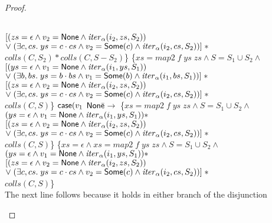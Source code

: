 \begin{proof}
\begin{itemize}
\begin{specification}
\\ \>\;     $[(zs = \epsilon \land v_2 = \mathsf{None} \land \mathit{iter}_\alpha(i_2, zs, S_2))$ 
\\ \>\;\;    $\vee\; (\exists c, cs.\; ys = c\cdot cs \land v_2 = \mathsf{Some}(c) \land 
                                \mathit{iter}_\alpha(i_2, cs, S_2))] \;*$ 
\\ \>\;     $\mathit{colls}(C,S_2) * \mathit{colls}(C, S - S_2)$\}
\nextline \{$xs = \mathit{map2}\;f\;ys\;zs \land 
                  S = S_1 \cup S_2 \land$ 
\\ \>\;     $[(ys = \epsilon \land v_1 = \mathsf{None} \land \mathit{iter}_\alpha(i_1, ys, S_1))$ 
\\ \>\;\;    $\vee\; (\exists b, bs.\; ys = b\cdot bs \land v_1 = \mathsf{Some}(b) \land 
                                \mathit{iter}_\alpha(i_1, bs, S_1))] \;*$ 
\\ \>\;     $[(zs = \epsilon \land v_2 = \mathsf{None} \land \mathit{iter}_\alpha(i_2, zs, S_2))$ 
\\ \>\;\;    $\vee\; (\exists c, cs.\; ys = c\cdot cs \land v_2 = \mathsf{Some}(c) \land 
                                \mathit{iter}_\alpha(i_2, cs, S_2))] \;*$ 
\\ \>\;     $\mathit{colls}(C,S)$\}
\nextline $\mathsf{case}(v_1$ 
\nextline \;\;\; $\mathsf{None}$\=$ \to $ 
\nextline \> \{$xs = \mathit{map2}\;f\;ys\;zs \land 
                  S = S_1 \cup S_2 \land$ 
\\ \> \>\;     $(ys = \epsilon \land v_1 = \mathsf{None} \land \mathit{iter}_\alpha(i_1, ys, S_1)) * $ 
\\ \> \>\;     $[(zs = \epsilon \land v_2 = \mathsf{None} \land \mathit{iter}_\alpha(i_2, zs, S_2))$ 
\\ \> \>\;\;    $\vee\; (\exists c, cs.\; ys = c\cdot cs \land v_2 = \mathsf{Some}(c) \land 
                                \mathit{iter}_\alpha(i_2, cs, S_2))] \;*$ 
\\ \> \>\;     $\mathit{colls}(C,S)$\}
\nextline \> \{$xs = \epsilon \land xs = \mathit{map2}\;f\;ys\;zs \land 
                  S = S_1 \cup S_2 \land$ 
\\ \> \>\;     $(ys = \epsilon \land v_1 = \mathsf{None} \land \mathit{iter}_\alpha(i_1, ys, S_1)) * $ 
\\ \> \>\;     $[(zs = \epsilon \land v_2 = \mathsf{None} \land \mathit{iter}_\alpha(i_2, zs, S_2))$ 
\\ \> \>\;\;    $\vee\; (\exists c, cs.\; ys = c\cdot cs \land v_2 = \mathsf{Some}(c) \land 
                                \mathit{iter}_\alpha(i_2, cs, S_2))] \;*$ 
\\ \> \>\;     $\mathit{colls}(C,S)$\}
\\ \> \>     The next line follows because it holds in either branch of the disjunction 

\end{specification}
\end{itemize}
\end{proof}
